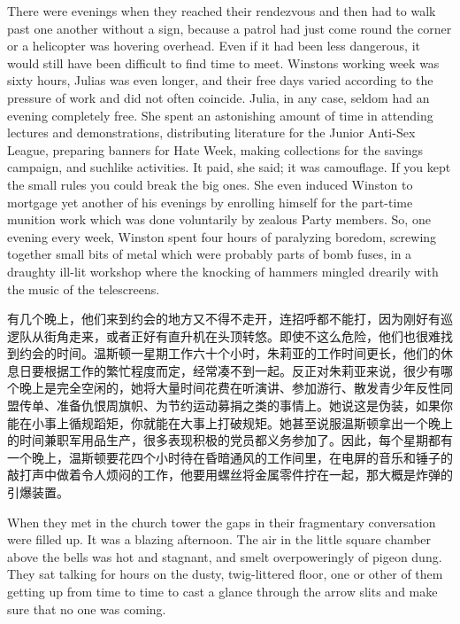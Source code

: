 \begin{paracol}{2}
\switchcolumn*

There were evenings when they reached their rendezvous and then had to
walk past one another without a sign, because a patrol had just come
round the corner or a helicopter was hovering overhead. Even if it had
been less dangerous, it would still have been difficult to find time to
meet. Winston\textquotesingle s working week was sixty hours,
Julia\textquotesingle s was even longer, and their free days varied
according to the pressure of work and did not often coincide. Julia, in
any case, seldom had an evening completely free. She spent an
astonishing amount of time in attending lectures and demonstrations,
distributing literature for the Junior Anti-Sex League, preparing
banners for Hate Week, making collections for the savings campaign, and
suchlike activities. It paid, she said; it was camouflage. If you kept
the small rules you could break the big ones. She even induced Winston
to mortgage yet another of his evenings by enrolling himself for the
part-time munition work which was done voluntarily by zealous Party
members. So, one evening every week, Winston spent four hours of
paralyzing boredom, screwing together small bits of metal which were
probably parts of bomb fuses, in a draughty ill-lit workshop where the
knocking of hammers mingled drearily with the music of the telescreens.

\switchcolumn

有几个晚上，他们来到约会的地方又不得不走开，连招呼都不能打，因为刚好有巡逻队从街角走来，或者正好有直升机在头顶转悠。即使不这么危险，他们也很难找到约会的时间。温斯顿一星期工作六十个小时，朱莉亚的工作时间更长，他们的休息日要根据工作的繁忙程度而定，经常凑不到一起。反正对朱莉亚来说，很少有哪个晚上是完全空闲的，她将大量时间花费在听演讲、参加游行、散发青少年反性同盟传单、准备仇恨周旗帜、为节约运动募捐之类的事情上。她说这是伪装，如果你能在小事上循规蹈矩，你就能在大事上打破规矩。她甚至说服温斯顿拿出一个晚上的时间兼职军用品生产，很多表现积极的党员都义务参加了。因此，每个星期都有一个晚上，温斯顿要花四个小时待在昏暗通风的工作间里，在电屏的音乐和锤子的敲打声中做着令人烦闷的工作，他要用螺丝将金属零件拧在一起，那大概是炸弹的引爆装置。

\switchcolumn*

When they met in the church tower the gaps in their fragmentary
conversation were filled up. It was a blazing afternoon. The air in the
little square chamber above the bells was hot and stagnant, and smelt
overpoweringly of pigeon dung. They sat talking for hours on the dusty,
twig-littered floor, one or other of them getting up from time to time
to cast a glance through the arrow slits and make sure that no one was
coming.


\end{paracol}
